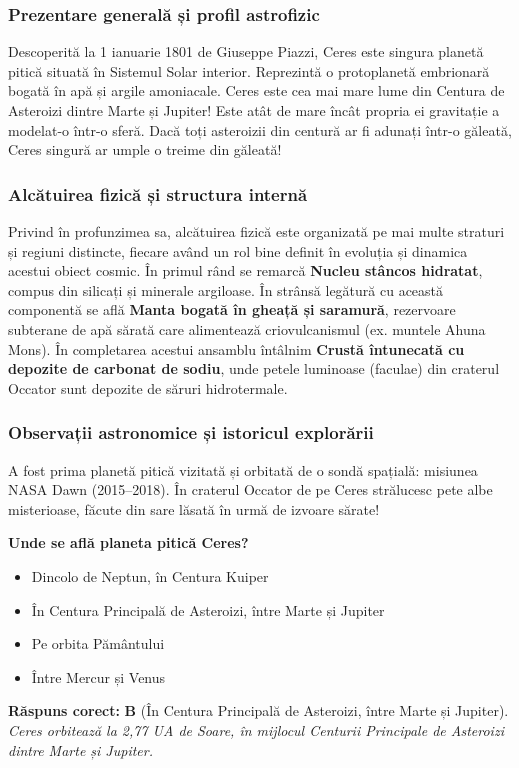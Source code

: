 \subsubsection*{Prezentare generală și profil astrofizic}
Descoperită la 1 ianuarie 1801 de Giuseppe Piazzi, Ceres este singura planetă pitică situată în Sistemul Solar interior. Reprezintă o protoplanetă embrionară bogată în apă și argile amoniacale. Ceres este cea mai mare lume din Centura de Asteroizi dintre Marte și Jupiter! Este atât de mare încât propria ei gravitație a modelat-o într-o sferă. Dacă toți asteroizii din centură ar fi adunați într-o găleată, Ceres singură ar umple o treime din găleată!

\subsubsection*{Alcătuirea fizică și structura internă}
Privind în profunzimea sa, alcătuirea fizică este organizată pe mai multe straturi și regiuni distincte, fiecare având un rol bine definit în evoluția și dinamica acestui obiect cosmic. În primul rând se remarcă \textbf{Nucleu stâncos hidratat}, compus din silicați și minerale argiloase. În strânsă legătură cu această componentă se află \textbf{Manta bogată în gheață și saramură}, rezervoare subterane de apă sărată care alimentează criovulcanismul (ex. muntele Ahuna Mons). În completarea acestui ansamblu întâlnim \textbf{Crustă întunecată cu depozite de carbonat de sodiu}, unde petele luminoase (faculae) din craterul Occator sunt depozite de săruri hidrotermale.

\subsubsection*{Observații astronomice și istoricul explorării}
A fost prima planetă pitică vizitată și orbitată de o sondă spațială: misiunea NASA Dawn (2015--2018). În craterul Occator de pe Ceres strălucesc pete albe misterioase, făcute din sare lăsată în urmă de izvoare sărate!

\vspace{6pt}
\begin{tcolorbox}[orbitarquiz, title={\textbf{Întrebare de verificare \#32: Ceres}}]
\textbf{Unde se află planeta pitică Ceres?}
\begin{itemize}[leftmargin=2.2em, itemsep=2pt, topsep=4pt]
  \item[$\square$ \textbf{A.}] Dincolo de Neptun, în Centura Kuiper
  \item[$\square$ \textbf{B.}] În Centura Principală de Asteroizi, între Marte și Jupiter
  \item[$\square$ \textbf{C.}] Pe orbita Pământului
  \item[$\square$ \textbf{D.}] Între Mercur și Venus
\end{itemize}
\vspace{2pt}
{\footnotesize\color{orbitarMuted}\textbf{Răspuns corect:} \textbf{B} (În Centura Principală de Asteroizi, între Marte și Jupiter). \emph{Ceres orbitează la 2,77 UA de Soare, în mijlocul Centurii Principale de Asteroizi dintre Marte și Jupiter.}}
\end{tcolorbox}
\clearpage


